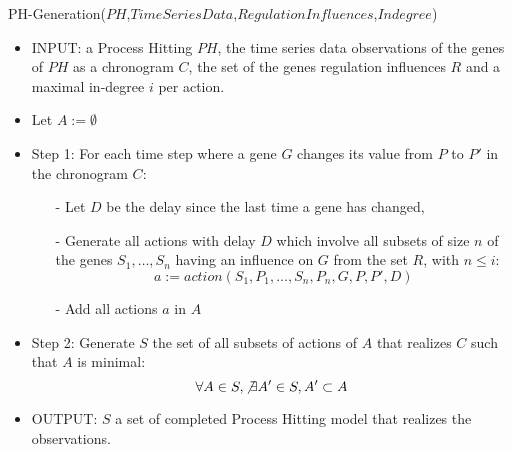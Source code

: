 \begin{algorithm}
	\caption{PH-Generation($PH$,$Time Series Data$,$Regulation Influences$,$Indegree$)}
	\label{alg:PHG_ap}
	\begin{itemize}
		\item INPUT: a Process Hitting $PH$, the time series data observations of the genes of $PH$ as a chronogram $C$, the set of the genes regulation influences $R$ and a maximal in-degree $i$ per action.

		\item Let $A := \emptyset$
		\item Step 1: For each time step where a gene $G$ changes its value from $P$ to $P'$ in the chronogram $C$:

		\begin{itemize}
			\item[-] Let $D$ be the delay since the last time a gene has changed,
			\item[-] Generate all actions with delay $D$ which involve all subsets of size $n$ of the genes $S_1, \ldots, S_n$ having an influence on $G$ from the set $R$, with $n \leq i$:
			$$a := action(S_1,P_1,\ldots, S_n,P_n, G, P, P', D)$$
			\item[-] Add all actions $a$ in $A$
		\end{itemize}
		
		
		\item Step 2: Generate $S$ the set of all subsets of actions of $A$ that realizes $C$ such that $A$ is minimal:
			$$\forall A \in S, \not \exists A' \in S, A' \subset A$$
			
		\item OUTPUT: $S$ a set of completed Process Hitting model that realizes the observations.
	\end{itemize}
\end{algorithm}

